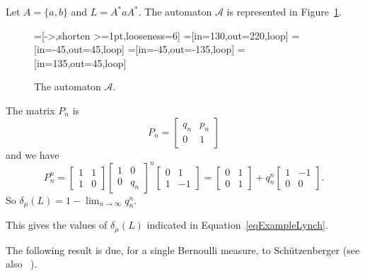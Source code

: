 \documentclass{article}[11pt]
\newcommand\A{\mathcal{A}}
\numberwithin{theorem}{section}
\numberwithin{equation}{section}
\numberwithin{figure}{section}
\numberwithin{table}{section}
\begin{document}
\begin{example}\label{exampleIdeal}
Let $A=\{a,b\}$ and $L=A^*aA^*$. The automaton $\A$ is represented in Figure~\ref{figureAutomatonA}.
\begin{figure}[hbt]
\centering
{}
    =[->,shorten >=1pt,looseness=6]
    =[in=130,out=220,loop]
    =[in=-45,out=45,loop]
    =[in=-45,out=-135,loop]
    =[in=135,out=45,loop]
\caption{The automaton $\A$.}\label{figureAutomatonA}
\end{figure}
The matrix $P_n$ is
\[P_n=\begin{bmatrix}q_n&p_n\\0&1\end{bmatrix}\]
and we have
\[P_n^n=\begin{bmatrix}1&1\\1&0\end{bmatrix}\begin{bmatrix}1&0\\0&q_n\end{bmatrix}^n\begin{bmatrix}0&1\\1&-1\end{bmatrix}
=\begin{bmatrix}0&1\\0&1\end{bmatrix}+q_n^n\begin{bmatrix}1&-1\\0&0\end{bmatrix}.\]
So $\delta_\mu(L)=1-\lim_{n\to\infty}q_n^n$.

This gives the values of $\delta_\mu(L)$ indicated in Equation~\eqref{eqExampleLynch}.


\end{example}


The following result is due, for a single Bernoulli measure, to Sch\"utzenberger \cite{Schutzenberger1965}
(see also ~\cite[Theorem 13.4.5]{BerstelPerrinReutenauer2009}).
\end{document}
